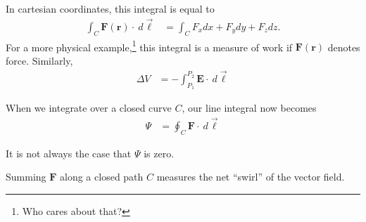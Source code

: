 \documentclass[10pt]{mypackage}
\begin{document}
In cartesian coordinates, this integral is equal to
\begin{align*}
  \int_{C}^{} \mathbf{F}\left(\mathbf{r}\right)\cdot\:d\vec{\ell} &= \int_{C}^{}F_x dx + F_y dy + F_z dz.
\end{align*}
For a more physical example,\footnote{Who cares about that?} this integral is a measure of work if $\mathbf{F}\left(\mathbf{r}\right)$ denotes force. Similarly,
\begin{align*}
  \Delta V &= -\int_{P_1}^{P_2} \mathbf{E}\cdot\:d\vec{\ell}
\end{align*}
\begin{definition}[Circulation]
When we integrate over a closed curve $C$, our line integral now becomes
\begin{align*}
  \Psi &= \oint_{C}^{} \mathbf{F}\cdot \:d\vec{\ell}
\end{align*}
\end{definition}
\begin{remark}
  It is not always the case that $\Psi$ is zero.
\end{remark}
Summing $\mathbf{F}$ along a closed path $C$ measures the net ``swirl'' of the vector field.
\end{document}
